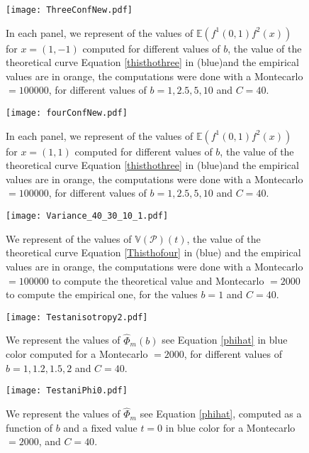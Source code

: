 \documentclass[12pt]{article}
\renewcommand{\hat}{\widehat}
\theoremstyle{Theorem}
\begin{document}
\begin{figure}[H]
  \centering
    {\texttt{[image: ThreeConfNew.pdf]}}
    \hspace{0.2cm}
 \caption{In each panel, we represent of the values of $\mathbb{E}\left(f^{1}(0,1)f^{2}(x)\right)$ for $x = (1,-1)$ computed for different values of $b$, the value of the theoretical curve Equation \eqref{thisthothree} in (blue)and the empirical values are in orange, the computations were done with a Montecarlo $= 100000$, for different values of $b = 1, 2.5, 5, 10$ and $C = 40$. }
\label{fig2}
\end{figure}

\begin{figure}[H]
  \centering
    {\texttt{[image: fourConfNew.pdf]}}
    \hspace{0.2cm}
 \caption{In each panel, we represent of the values of $\mathbb{E}\left(f^{1}(0,1)f^{2}(x)\right)$ for $x = (1, 1)$ computed for different values of $b$, the value of the theoretical curve Equation \eqref{thisthothree} in (blue)and the empirical values are in orange, the computations were done with a Montecarlo $= 100000$, for different values of $b = 1, 2.5, 5, 10$ and $C = 40$. }
\label{fig2}
\end{figure}

\begin{figure}[H]
  \centering
    {\texttt{[image: Variance\_40\_30\_10\_1.pdf]}}
    \hspace{0.2cm}
 \caption{We represent of the values of $\mathbb{V}\left(\mathcal{P}\right)(t)$, the value of the theoretical curve Equation \eqref{Thisthofour} in (blue) and the empirical values are in orange, the computations were done with a Montecarlo $= 100000$ to compute the theoretical value and Montecarlo $= 2000$ to compute the empirical one, for the values $b = 1$ and $C = 40$. }
\label{fig2}
\end{figure}

\begin{figure}[H]
  \centering
    {\texttt{[image: Testanisotropy2.pdf]}}
    \hspace{0.2cm} 
 \caption{We represent the values of $\hat{\Phi}_{m}(b)$ see Equation \eqref{phihat} in blue color computed for a Montecarlo $= 2000$, for different values of $b = 1, 1.2, 1.5, 2$ and $C = 40$.}
\label{fig2}
\end{figure}

\begin{figure}[H]
  \centering
    {\texttt{[image: TestaniPhi0.pdf]}}
    \hspace{0.2cm} 
 \caption{We represent the values of $\hat{\Phi}_{m}$ see Equation \eqref{phihat}, computed as a function of $b$ and a fixed value $t=0$ in blue color for a Montecarlo $= 2000$, and $C = 40$.}
\label{fig2}
\end{figure}
\end{document}
